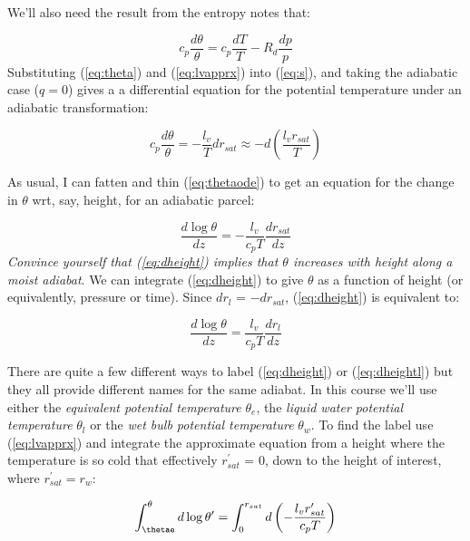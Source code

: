 \documentclass[12pt]{article}
\begin{document}
We'll also need the result from the entropy notes  that:

\begin{equation}
  \label{eq:theta}
  c_p \frac{d\theta}{\theta} = c_p \frac{dT}{T} - R_d\frac{dp}{p}
\end{equation}
Substituting (\ref{eq:theta}) and (\ref{eq:lvapprx}) into
(\ref{eq:s}), and taking the adiabatic case ($q=0$) gives a
a differential equation for the potential temperature under
an adiabatic transformation:

\begin{equation}
\label{eq:thetaode}
c_p \frac{ d \theta}{\theta} = - \frac{l_v}{T} d r_{sat} \approx - d \left ( \frac{l_v r_{sat}}{ T} \right )  
\end{equation}

As usual, I can fatten and thin (\ref{eq:thetaode}) to get an equation
for the change in $\theta$ wrt, say, height, for an adiabatic parcel:

\begin{equation}
\label{eq:dheight}
 \frac{ d \log \theta}{dz} = - \frac{l_v}{c_ p T}\frac{ d r_{sat}}{dz}
\end{equation}
\textit{Convince yourself that (\ref{eq:dheight}) implies that
  $\theta$ increases with height along a moist adiabat}.  We can
integrate (\ref{eq:dheight}) to give $\theta$ as a function of height
(or equivalently, pressure or time).  Since
$dr_l$ = $-dr_{sat}$, (\ref{eq:dheight}) is equivalent to:

\begin{equation}
\label{eq:dheightl}
 \frac{ d \log \theta}{dz} = \frac{l_v}{c_ p T}\frac{d r_l}{dz}
\end{equation}

There are quite a few different ways to label (\ref{eq:dheight}) or 
(\ref{eq:dheightl}) but they all provide different names for the
same adiabat.  In this course we'll use either the 
\textit{equivalent potential temperature} $\theta_e$, the 
\textit{liquid water potential temperature} $\theta_l$ or the
\textit{wet bulb potential temperature} $\theta_w$.  To find the
\thetae label use (\ref{eq:lvapprx}) and integrate the approximate
equation from a height where the temperature is so cold that
effectively $r_{sat}^\prime$ = 0, down to the height of interest, where
$r_{sat}^\prime = r_w$:

\begin{equation}
  \label{eq:thetae0}
  \int_{\thetae}^\theta d \log \theta^\prime = 
\int_0^{r_{sat}} d \left ( - \frac{l_v r_{sat}^\prime}{c_p T} \right )
\end{equation}
\end{document}
